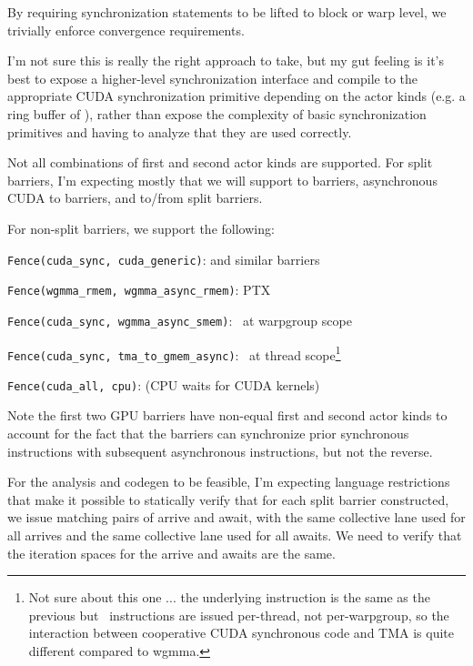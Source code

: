 By requiring synchronization statements to be lifted to block or warp level, we trivially enforce convergence requirements.

\filbreak
I'm not sure this is really the right approach to take, but my gut feeling is it's best to expose a higher-level synchronization interface and compile to the appropriate CUDA synchronization primitive depending on the actor kinds (e.g. a ring buffer of \mbarrier), rather than expose the complexity of basic synchronization primitives and having to analyze that they are used correctly.

\filbreak
Not all combinations of first and second actor kinds are supported.
For split barriers, I'm expecting mostly that we will support  to  barriers, asynchronous CUDA to  barriers, and  to/from  split barriers.

\filbreak
For non-split barriers, we support the following:

\texttt{Fence(cuda\_sync, cuda\_generic)}:  and similar barriers

\texttt{Fence(wgmma\_rmem, wgmma\_async\_rmem)}: PTX \wgmmaFence

\texttt{Fence(cuda\_sync, wgmma\_async\_smem)}: \fenceProxyAsync\ at warpgroup scope

\texttt{Fence(cuda\_sync, tma\_to\_gmem\_async)}: \fenceProxyAsync\ at thread scope\footnote{Not sure about this one ... the underlying instruction is the same as the previous but \cpAsyncBulk\ instructions are issued per-thread, not per-warpgroup, so the interaction between cooperative CUDA synchronous code and TMA is quite different compared to wgmma.}

\texttt{Fence(cuda\_all, cpu)}:  (CPU waits for CUDA kernels)

\filbreak
Note the first two GPU barriers have non-equal first and second actor kinds to account for the fact that the barriers can synchronize prior synchronous instructions with subsequent asynchronous instructions, but not the reverse.

\filbreak
{} For the analysis and codegen to be feasible, I'm expecting language restrictions that make it possible to statically verify that for each split barrier constructed, we issue matching pairs of arrive and await, with the same collective lane used for all arrives and the same collective lane used for all awaits.
We need to verify that the iteration spaces for the arrive and awaits are the same.

